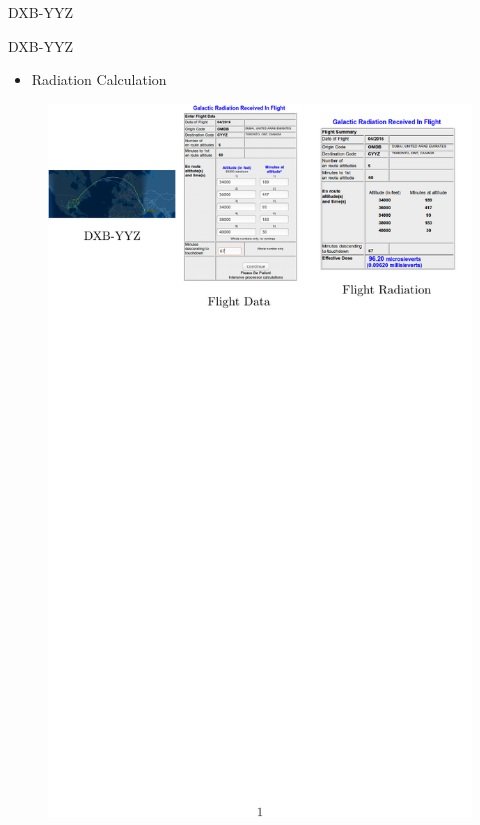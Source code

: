 \documentclass[aspectratio=1610]{beamer}
\newcommand{\semitransp}[2][35]{\color{fg!#1}#2}
\begin{document}
\begin{frame}{DXB-YYZ}

\begin{block}{DXB-YYZ}
\end{block}
\begin{itemize}
\item Radiation Calculation

\end{itemize}
\vspace{-0.5cm}
\begin{figure}[]

   \includegraphics[scale=1.1]{images/DXB-TO-YYZ.pdf}   
 \end{figure} 
\end{frame}
\end{document}
